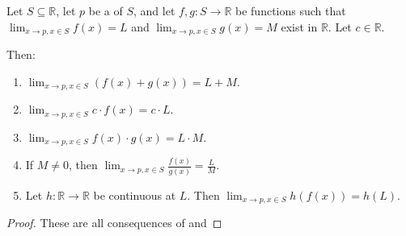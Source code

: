 \begin{proposition} \label{proposition:limit_algebra_for_real_valued_functions}
    Let $S \subseteq \mathbb{R}$, let $p$ be a  of $S$, and let $f, g : S \to \mathbb{R}$ be functions such that $\lim_{x \to p, x \in S} f(x) = L$ and $\lim_{x \to p, x \in S} g(x) = M$ exist in $\mathbb{R}$. Let $c \in \mathbb{R}$.

    Then:
    \begin{enumerate}
        \item[$($sum$)$] $\lim_{x \to p, x \in S} (f(x) + g(x)) = L + M$.
        \item[$($scalar$)$] $\lim_{x \to p, x \in S} c \cdot f(x) = c \cdot L$.
        \item[$($product$)$] $\lim_{x \to p, x \in S} f(x) \cdot g(x) = L \cdot M$.
        \item[$($quotient$)$] If $M \neq 0$, then $\lim_{x \to p, x \in S} \frac{f(x)}{g(x)} = \frac{L}{M}$.
        \item[$($composition$)$] Let $h : \mathbb{R} \to \mathbb{R}$ be continuous at $L$. 
        Then $\lim_{x \to p, x \in S} h(f(x)) = h(L)$.
    \end{enumerate}
\end{proposition}

\begin{proof}
    These are all consequences of  and 
\end{proof}